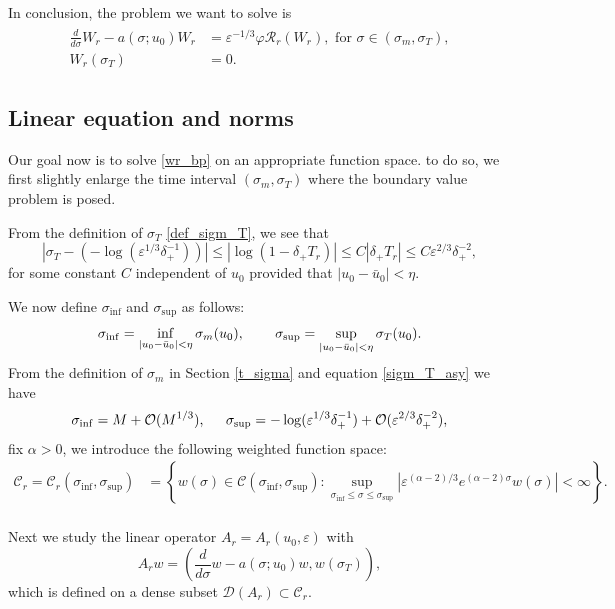 \documentclass[letterpaper,11pt]{article}
\newcommand{\Ral}{\mathcal{R}}
\newcommand{\rmO}{\mathcal{O}}
\newcommand{\eps}{\varepsilon}
\numberwithin{equation}{section}
\theoremstyle{plain}
\begin{document}
In conclusion, the problem we want to solve is
\begin{align}\label{wr_bp}
\begin{split}
\frac{d}{d\sigma} W_r - a(\sigma;u_0)W_r &= \eps^{-1/3}\varphi \Ral_r(W_r), \text{ for } \sigma \in (\sigma_m, \sigma_T),\\
W_r(\sigma_T) &= 0.
\end{split}
\end{align}


\subsection{Linear equation and norms}


Our goal now is to solve \eqref{wr_bp} on an appropriate function space. to do so, we first slightly enlarge the time interval $(\sigma_m, \sigma_T)$ where the boundary value problem is posed.

From the definition of $\sigma_T$ \eqref{def_sigm_T}, we see that
\begin{equation}\label{sigm_T_asy}
|\sigma_T -(-\log(\eps^{1/3}\delta_+^{-1}))| \le |\log(1-\delta_+ T_r)| \le  C|\delta_+ T_r|\le C\eps^{2/3}\delta_+^{-2},
\end{equation} 
for some constant $C$ independent of $u_0$ provided that $|u_0-\bar{u}_0|<\eta$.

We now define $\sigma_{\inf}$ and $\sigma_{\sup}$ as follows:
\[
\sigma_{\inf} = \inf_{|u_0-\bar{u}_0|<\eta}\sigma_m(u_0), \hspace{0.3in} \sigma_{\sup} = \sup_{|u_0-\bar{u}_0|<\eta}\sigma_T(u_0).
\]
From the definition of $\sigma_m$ in Section \ref{t_sigma} and equation \eqref{sigm_T_asy} we have
\[
\sigma_{\inf} = M + \rmO(M^{1/3}), \hspace{0.2in} \sigma_{\sup} = -\log(\eps^{1/3}\delta_+^{-1}) + \rmO(\eps^{2/3}\delta_+^{-2}),
\]
fix $\alpha>0$, we introduce the following weighted function space:
\begin{align*}
\mathcal{C}_r=\mathcal{C}_r(\sigma_{\inf}, \sigma_{\sup}) &= \left\{ w(\sigma) \in \mathcal{C}(\sigma_{\inf}, \sigma_{\sup}) : \sup_{\sigma_{\inf} \le \sigma \le \sigma_{\sup} } \left|\eps^{(\alpha-2)/3} e^{(\alpha-2)\sigma}w(\sigma)\right| < \infty \right\}. \\
\end{align*}


Next we study the linear operator $A_r=A_r(u_0,\eps)$ with
\[
A_r w = \left( \frac{d}{d\sigma}w-a(\sigma; u_0) w,  w(\sigma_T)\right),
\]
which is defined on a dense subset $\mathcal{D}(A_r) \subset \mathcal{C}_r$.
\end{document}
